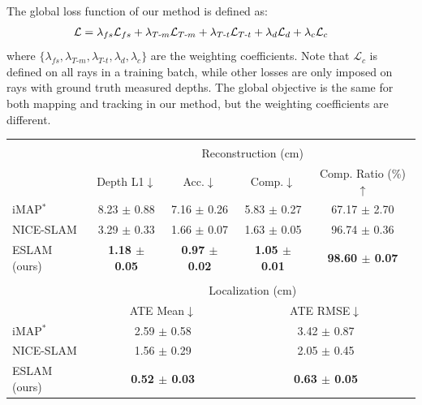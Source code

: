 The global loss function of our method is defined as:
\begin{align}
	\hspace{-0.75em} \mathcal{L} &= \lambda_{fs}\mathcal{L}_{fs} + \lambda_{T\text{-}m}\mathcal{L}_{T\text{-}m} + \lambda_{T\text{-}t}\mathcal{L}_{T\text{-}t} + \lambda_{d}\mathcal{L}_{d} + \lambda_{c}\mathcal{L}_{c}
\end{align}
where $\{\lambda_{fs}, \lambda_{T\text{-}m}, \lambda_{T\text{-}t}, \lambda_{d}, \lambda_{c}\}$ are the weighting coefficients. Note that $\mathcal{L}_{c}$ is defined on all rays in a training batch, while other losses are only imposed on rays with ground truth measured depths. The global objective is the same for both mapping and tracking in our method, but the weighting coefficients are different.

\begin{table}[t]
    \begin{center}
        \begin{tabular}{l|cccc}
            \Xhline{2\arrayrulewidth}
            \multirow{3}{*}{Method} \\
            & \multicolumn{4}{c}{Reconstruction (cm)} \\
            & Depth L1$\downarrow$ & Acc.$\downarrow$ & Comp.$\downarrow$ & Comp. Ratio (\%)$\uparrow$ \\
            
            \hline
            iMAP$^{*}$ & 8.23 $\pm$ 0.88 & 7.16 $\pm$ 0.26 & 5.83 $\pm$ 0.27 & 67.17 $\pm$ 2.70 \\
            NICE-SLAM & 3.29 $\pm$ 0.33 & 1.66 $\pm$ 0.07 & 1.63 $\pm$ 0.05 & 96.74 $\pm$ 0.36 \\
            ESLAM (ours) & \textbf{1.18 $\pm$ 0.05} & \textbf{0.97 $\pm$ 0.02} & \textbf{1.05 $\pm$ 0.01} & \textbf{98.60 $\pm$ 0.07} \\

            \cline{2-5}
            \\
            & \multicolumn{4}{c}{Localization (cm)} \\
            & \multicolumn{2}{c}{ATE Mean$\downarrow$} & \multicolumn{2}{c}{ATE RMSE$\downarrow$} \\
            \cline{2-5}
            iMAP$^{*}$ & \multicolumn{2}{c}{2.59 $\pm$ 0.58} & \multicolumn{2}{c}{3.42 $\pm$ 0.87} \\
            NICE-SLAM & \multicolumn{2}{c}{1.56 $\pm$ 0.29} & \multicolumn{2}{c}{2.05 $\pm$ 0.45} \\
            ESLAM (ours) & \multicolumn{2}{c}{\textbf{0.52 $\pm$ 0.03}} & \multicolumn{2}{c}{\textbf{0.63 $\pm$ 0.05}} \\
            

\end{tabular}
\end{center}
\end{table}

